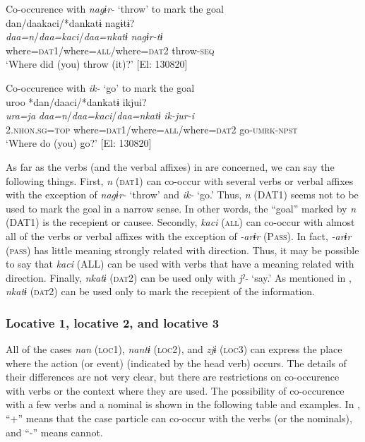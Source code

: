 \ex Co-occurence with \textit{nagɨr-} ‘throw’ to mark the goal\\

{\TM}
\glll *dan/daakaci/*dankatɨ  nagɨtɨ?\\
\textit{daa=n}/\textit{daa=kaci}/\textit{daa=nkatɨ}  \textit{nagɨr-tɨ}\\
     where=\textsc{dat}1/where=\textsc{all}/where=\textsc{dat2}  throw-\textsc{seq}\\
 \glt    ‘Where did (you) throw (it)?’ [El: 130820]

\ex Co-occurence with \textit{ik-} ‘go’ to mark the goal\\

{\TM}
\glll uroo  *dan/daaci/*dankatɨ  ikjui?\\
\textit{ura=ja}  \textit{daa=n}/\textit{daa=kaci}/\textit{daa=nkatɨ}  \textit{ik-jur-i}\\
    2.\textsc{nhon}.\textsc{sg}=\textsc{top}  where=\textsc{dat}1/where=\textsc{all}/where=\textsc{dat2}  go-\textsc{umrk}-\textsc{npst}\\
 \glt    ‘Where do (you) go?’ [El: 130820]
\z
\z

As far as the verbs (and the verbal affixes) in  are concerned, we can say the following things. First, \textit{n} (\textsc{dat}1) can co-occur with several verbs or verbal affixes with the exception of \textit{nagɨr-} ‘throw’ and \textit{ik-} ‘go.’ Thus, \textit{n} (DAT1) seems not to be used to mark the goal in a narrow sense. In other words, the “goal” marked by \textit{n} (DAT1) is the recepient or causee. Secondly, \textit{kaci} (\textsc{all}) can co-occur with almost all of the verbs or verbal affixes with the exception of \textit{-arɨr} (P\textsc{ass}). In fact, \textit{-arɨr} (\textsc{pass}) has little meaning strongly related with direction. Thus, it may be possible to say that \textit{kaci} (ALL) can be used with verbs that have a meaning related with direction. Finally, \textit{nkatɨ} (\textsc{dat2}) can be used only with \textit{jˀ-} ‘say.’ As mentioned in , \textit{nkatɨ} (\textsc{dat2}) can be used only to mark the recepient of the information.

\subsubsection{Locative 1, locative 2, and locative 3}

All of the cases \textit{nan} (\textsc{loc1}), \textit{nantɨ} (\textsc{loc2}), and \textit{zjɨ} (\textsc{loc3}) can express the place where the action (or event) (indicated by the head verb) occurs. The details of their differences are not very clear, but there are restrictions on co-occurence with verbs or the context where they are used. The possibility of co-occurence with a few verbs and a nominal is shown in the following table and examples. In , “+” means that the case particle can co-occur with the verbs (or the nominals), and “-” means cannot.

